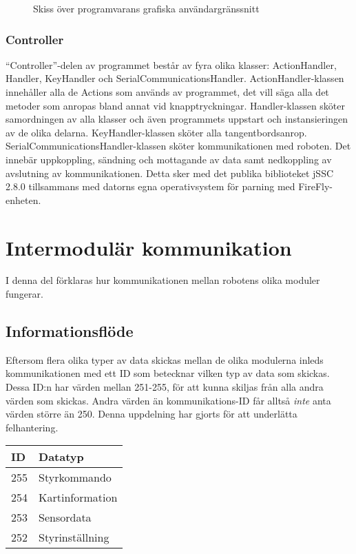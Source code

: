 \documentclass[11pt]{article}
\begin{document}
\begin{flushleft}
\begin{figure}[H]
\centering
\noindent\resizebox{.8\linewidth}{!}{
	}
	\caption{Skiss över programvarans grafiska användargränssnitt\label{software}}	
\end{figure}

\subsubsection{Controller}
``Controller''-delen av programmet består av fyra olika klasser: ActionHandler, Handler, KeyHandler och SerialCommunicationsHandler. 
ActionHandler-klassen innehåller alla de Actions som används av programmet, det vill säga alla det metoder som anropas bland annat vid knapptryckningar.
Handler-klassen sköter samordningen av alla klasser och även programmets uppstart och instansieringen av de olika delarna.
KeyHandler-klassen sköter alla tangentbordsanrop.
SerialCommunicationsHandler-klassen sköter kommunikationen med roboten. Det innebär uppkoppling, sändning och mottagande av data samt nedkoppling av avslutning av kommunikationen. Detta sker med det publika biblioteket jSSC 2.8.0 tillsammans med datorns egna operativsystem för parning med FireFly-enheten.

\pagebreak

\section{Intermodulär kommunikation}
I denna del förklaras hur kommunikationen mellan robotens olika moduler fungerar.

\subsection{Informationsflöde}
Eftersom flera olika typer av data skickas mellan de olika modulerna inleds kommunikationen med ett ID som betecknar vilken typ av data som skickas. Dessa ID:n har värden mellan 251-255, för att kunna skiljas från alla andra värden som skickas. Andra värden än kommunikations-ID får alltså \emph{inte} anta värden större än 250. Denna uppdelning har gjorts för att underlätta felhantering.

\begin{longtable}[l]{| l | l |} \hline
\textbf{ID} & \textbf{Datatyp} \\ \hline 
255 & Styrkommando \\ \hline
254 & Kartinformation \\ \hline
253 & Sensordata \\ \hline
252 & Styrinställning \\ \hline


\end{longtable}
\end{flushleft}
\end{document}
